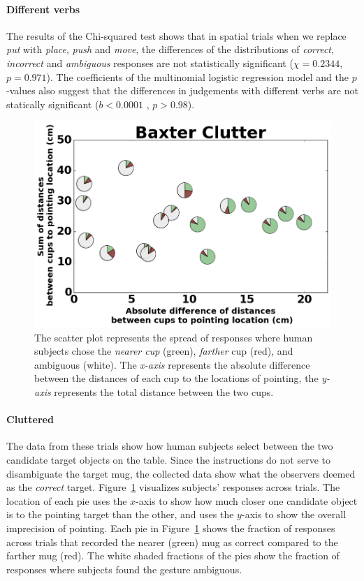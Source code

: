 \documentclass[letterpaper]{article} %
\begin{document}
\paragraph{Different verbs}
The results of the Chi-squared test shows that in spatial trials when we replace \textit{put} with \textit{place}, \textit{push} and \textit{move}, the differences of the distributions of \textit{correct}, \textit{incorrect} and \textit{ambiguous} responses are not statistically significant ($\chi=0.2344 $, $p = 0.971$). The coefficients of the multinomial logistic regression model and the $p$-values also suggest that the differences in judgements 
with different verbs are not statically significant ($b<0.0001$ , $p>0.98$).


\begin{figure}[ht]
    \centering
    \includegraphics[width=\linewidth]{baxter_Clutter_granular.png}
    \caption{The scatter plot represents the spread of responses where human subjects chose the \textit{nearer cup} (green), \textit{farther} cup (red), and ambiguous (white). The \textit{x-axis} represents the absolute difference between the distances of each cup to the locations of pointing, the \textit{y-axis} represents the total distance between the two cups.}
    \label{fig:cluttered}
\end{figure}
\paragraph{Cluttered}
The data from these trials show how human subjects select between the two candidate target objects on the table. Since the instructions do not serve to disambiguate the target mug, the collected data show what the observers deemed as the \textit{correct} target.  Figure~\ref{fig:cluttered} visualizes subjects' responses across trials.  The location of each pie uses the $x$-axis to show how much closer one candidate object is to the pointing target than the other, and uses the $y$-axis to show the overall imprecision of pointing.  Each pie in Figure~\ref{fig:cluttered} shows the fraction of responses across trials that recorded the nearer (green) mug as correct compared to the farther mug (red). The white shaded fractions of the pies show the fraction of responses where subjects found the gesture ambiguous.
\end{document}
